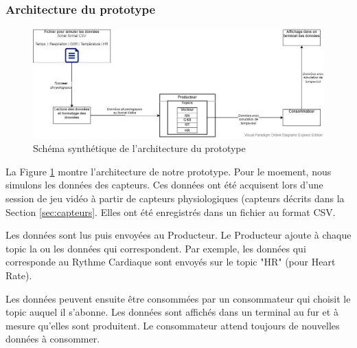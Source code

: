 \documentclass{article}
\begin{document}
		\subsubsection{Architecture du prototype}\label{sec:protoarchi}
			\begin{figure}[t]
				\centering
				\hspace*{-1.7cm}
				\includegraphics[scale=0.75]{../include/schema-synt-prototype.jpg}
				\caption{Schéma synthétique de l'architecture du prototype}
				\label{fig:archiproto}
			\end{figure}
			La Figure \ref{fig:archiproto} montre l'architecture de notre prototype.
			Pour le moement, nous simulons les données des capteurs.
			Ces données ont été acquisent lors d'une session de jeu vidéo à partir de capteurs physiologiques (capteurs décrits dans la Section \ref{sec:capteurs}.
			Elles ont été enregistrés dans un fichier au format CSV.\par
			Les données sont lus puis envoyées au Producteur.
			Le Producteur ajoute à chaque topic la ou les données qui correspondent.
			Par exemple, les données qui corresponde au Rythme Cardiaque sont envoyés sur le topic "HR" (pour Heart Rate).\par
			Les données peuvent ensuite être consommées par un consommateur qui choisit le topic auquel il s'abonne.
			Les données sont affichés dans un terminal au fur et à mesure qu'elles sont produitent.
			Le consommateur attend toujours de nouvelles données à consommer.
\end{document}
